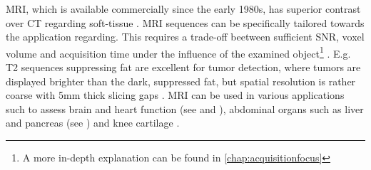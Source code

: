        \ac{MRI}, which is available commercially since the early 1980s, has superior contrast over CT regarding soft-tissue \citep{abramson2023surgeons, kabasawa2022mr}. \ac{MRI} sequences can be specifically tailored towards the application regarding. This requires a trade-off beetween sufficient \ac{SNR}, voxel volume and acquisition time under the influence of the examined object\footnote{A more in-depth explanation can be found in \ref{chap:acquisitionfocus}} \citep{macovski1996noise}. E.g. T2 sequences suppressing fat are excellent for tumor detection, where tumors are displayed brighter than the dark, suppressed fat, but spatial resolution is rather coarse with 5mm thick slicing gaps \citep{abramson2023surgeons}.
        \ac{MRI} can be used in various applications such to assess brain and heart function (see  and ), abdominal organs such as liver and pancreas (see ) and knee cartilage \citep{mazurowski2019deep}.







